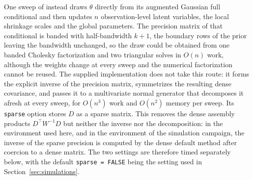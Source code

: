 One sweep of \citet{onizuka2024fast} instead draws $\theta$ directly from its augmented Gaussian full conditional and then updates $n$ observation-level latent variables, the local shrinkage scales and the global parameters. The precision matrix of that conditional is banded with half-bandwidth $k + 1$, the boundary rows of the prior leaving the bandwidth unchanged, so the draw could be obtained from one banded Cholesky factorization and two triangular solves in $O(n)$ work, although the weights change at every sweep and the numerical factorization cannot be reused. The supplied implementation does not take this route: it forms the explicit inverse of the precision matrix, symmetrizes the resulting dense covariance, and passes it to a multivariate normal generator that decomposes it afresh at every sweep, for $O(n^3)$ work and $O(n^2)$ memory per sweep. Its \texttt{sparse} option stores $D$ as a sparse matrix. This removes the dense assembly products $D^\top W^{-1} D$ but neither the inverse nor the decomposition: in the environment used here, and in the environment of the simulation campaign, the inverse of the sparse precision is computed by the dense default method after coercion to a dense matrix. The two settings are therefore timed separately below, with the default \texttt{sparse = FALSE} being the setting used in Section~\ref{sec:simulations}.

